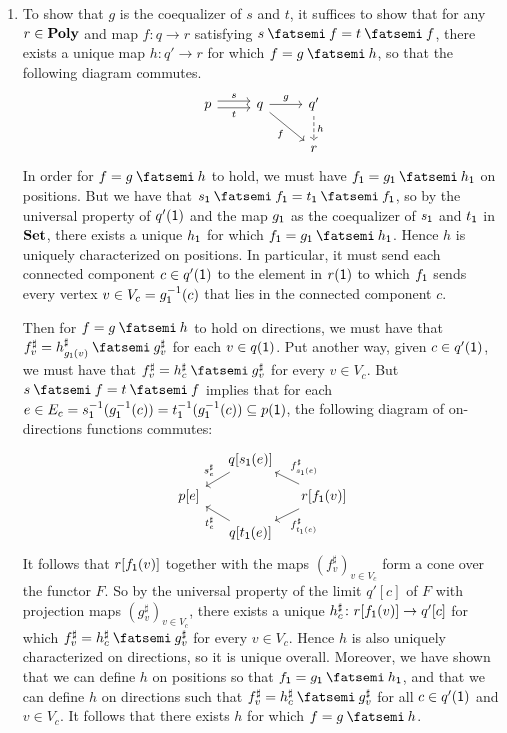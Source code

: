 \documentclass[Book-Poly]{subfiles}
\begin{document}
\begin{exercise}
\begin{solution}
\begin{enumerate}
    \item To show that $g$ is the coequalizer of $s$ and $t$, it suffices to show that for any $r \in \mathbf{Poly}$ and map $f \colon q \to r$ satisfying $s \then f = t \then f$, there exists a unique map $h \colon q' \to r$ for which $f = g \then h$, so that the following diagram commutes.
    \begin{equation*} %
    \begin{tikzcd}
        p \ar[r, "s", shift left] \ar[r, "t"', shift right] & q \ar[r, "g"] \ar[dr, "f"'] & q' \ar[d, "h", dashed] \\
        & & r
    \end{tikzcd}
    \end{equation*}
    In order for $f = g \then h$ to hold, we must have $f_\1 = g_\1 \then h_\1$ on positions.
    But we have that $s_\1 \then f_\1 = t_\1 \then f_\1$, so by the universal property of $q'(\textsf{1})$ and the map $g_{\textsf{1}}$ as the coequalizer of $s_{\textsf{1}}$ and $t_{\textsf{1}}$ in $\mathbf{Set}$, there exists a unique $h_{\textsf{1}}$ for which $f_\1 = g_\1 \then h_\1$.
    Hence $h$ is uniquely characterized on positions.
    In particular, it must send each connected component $c \in q'(\textsf{1})$ to the element in $r(\textsf{1})$ to which $f_{\textsf{1}}$ sends every vertex $v \in V_c = g_{\textsf{1}}^{-1}(c)$ that lies in the connected component $c$.
    
    Then for $f = g \then h$ to hold on directions, we must have that $f^\sharp_v = h^\sharp_{g_\1(v)} \then g^\sharp_v$ for each $v \in q(\textsf{1})$.
    Put another way, given $c \in q'(\textsf{1})$, we must have that $f^\sharp_v = h^\sharp_c \then g^\sharp_v$ for every $v \in V_c$.
    But $s \then f = t \then f$ implies that for each $e \in E_c = s_{\textsf{1}}^{-1}(g_{\textsf{1}}^{-1}(c)) = t_{\textsf{1}}^{-1}(g_{\textsf{1}}^{-1}(c)) \subseteq p(\textsf{1})$, the following diagram of on-directions functions commutes:
    \[
    \begin{tikzcd}[sep=small]
        & q[s_\1(e)] \ar[dl, "s^\sharp_e"'] \\
        p[e] & & r[f_\1(v)] \ar[ul, "f^\sharp_{s_\1(e)}"'] \ar[dl, "f^\sharp_{t_\1(e)}"] \\
        & q[t_\1(e)] \ar[ul, "t^\sharp_e"]
    \end{tikzcd}
    \]
    It follows that $r[f_{\textsf{1}}(v)]$ together with the maps $(f^\sharp_v)_{v \in V_c}$ form a cone over the functor $F$.
    So by the universal property of the limit $q'[c]$ of $F$ with projection maps $(g^\sharp_v)_{v \in V_c}$, there exists a unique $h^\sharp_c \colon r[f_{\textsf{1}}(v)] \to q'[c]$ for which $f^\sharp_v = h^\sharp_c \then g^\sharp_v$ for every $v \in V_c$.
    Hence $h$ is also uniquely characterized on directions, so it is unique overall.
    Moreover, we have shown that we can define $h$ on positions so that $f_\1 = g_\1 \then h_\1$, and that we can define $h$ on directions such that $f^\sharp_v = h^\sharp_c \then g^\sharp_v$ for all $c \in q'(\textsf{1})$ and $v \in V_c$.
    It follows that there exists $h$ for which $f = g \then h$.
\end{enumerate}
\end{solution}
\end{exercise}
\end{document}
